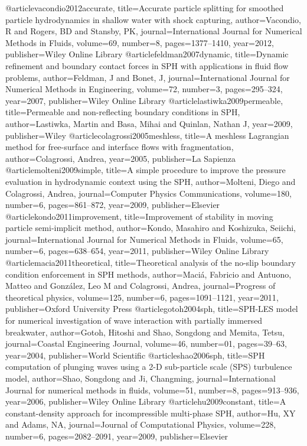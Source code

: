 @article{vacondio2012accurate,
  title={Accurate particle splitting for smoothed particle hydrodynamics in shallow water with shock capturing},
  author={Vacondio, R and Rogers, BD and Stansby, PK},
  journal={International Journal for Numerical Methods in Fluids},
  volume={69},
  number={8},
  pages={1377--1410},
  year={2012},
  publisher={Wiley Online Library}
}
@article{feldman2007dynamic,
  title={Dynamic refinement and boundary contact forces in SPH with applications in fluid flow problems},
  author={Feldman, J and Bonet, J},
  journal={International Journal for Numerical Methods in Engineering},
  volume={72},
  number={3},
  pages={295--324},
  year={2007},
  publisher={Wiley Online Library}
}
@article{lastiwka2009permeable,
  title={Permeable and non-reflecting boundary conditions in SPH},
  author={Lastiwka, Martin and Basa, Mihai and Quinlan, Nathan J},
  year={2009},
  publisher={Wiley}
}
@article{colagrossi2005meshless,
  title={A meshless Lagrangian method for free-surface and interface flows with fragmentation},
  author={Colagrossi, Andrea},
  year={2005},
  publisher={La Sapienza}
}
@article{molteni2009simple,
  title={A simple procedure to improve the pressure evaluation in hydrodynamic context using the SPH},
  author={Molteni, Diego and Colagrossi, Andrea},
  journal={Computer Physics Communications},
  volume={180},
  number={6},
  pages={861--872},
  year={2009},
  publisher={Elsevier}
}
@article{kondo2011improvement,
  title={Improvement of stability in moving particle semi-implicit method},
  author={Kondo, Masahiro and Koshizuka, Seiichi},
  journal={International Journal for Numerical Methods in Fluids},
  volume={65},
  number={6},
  pages={638--654},
  year={2011},
  publisher={Wiley Online Library}
}
@article{macia2011theoretical,
  title={Theoretical analysis of the no-slip boundary condition enforcement in SPH methods},
  author={Maci{\'a}, Fabricio and Antuono, Matteo and Gonz{\'a}lez, Leo M and Colagrossi, Andrea},
  journal={Progress of theoretical physics},
  volume={125},
  number={6},
  pages={1091--1121},
  year={2011},
  publisher={Oxford University Press}
}
@article{gotoh2004sph,
  title={SPH-LES model for numerical investigation of wave interaction with partially immersed breakwater},
  author={Gotoh, Hitoshi and Shao, Songdong and Memita, Tetsu},
  journal={Coastal Engineering Journal},
  volume={46},
  number={01},
  pages={39--63},
  year={2004},
  publisher={World Scientific}
}
@article{shao2006sph,
  title={SPH computation of plunging waves using a 2-D sub-particle scale (SPS) turbulence model},
  author={Shao, Songdong and Ji, Changming},
  journal={International Journal for numerical methods in fluids},
  volume={51},
  number={8},
  pages={913--936},
  year={2006},
  publisher={Wiley Online Library}
}
@article{hu2009constant,
  title={A constant-density approach for incompressible multi-phase SPH},
  author={Hu, XY and Adams, NA},
  journal={Journal of Computational Physics},
  volume={228},
  number={6},
  pages={2082--2091},
  year={2009},
  publisher={Elsevier}
}

